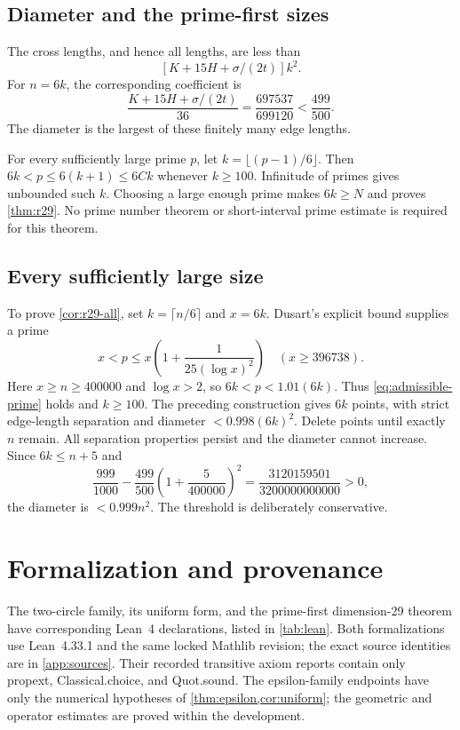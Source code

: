 \documentclass[11pt]{article}
\numberwithin{equation}{section}
\theoremstyle{definition}\newtheorem{definition}[theorem]{Definition}
\theoremstyle{remark}\newtheorem{remark}[theorem]{Remark}
\newcommand{\code}[1]{{\ttfamily\small #1}}
\begin{document}
\subsection{Diameter and the prime-first sizes}

The cross lengths, and hence all lengths, are less than
\[
 [K+15H+\sigma/(2t)]k^2.
\]
For $n=6k$, the corresponding coefficient is
\begin{equation}\label{eq:diameter29}
 \frac{K+15H+\sigma/(2t)}{36}
 =\frac{697537}{699120}<\frac{499}{500}.
\end{equation}
The diameter is the largest of these finitely many edge lengths.

For every sufficiently large prime $p$, let $k=\lfloor(p-1)/6\rfloor$.
Then $6k<p\le6(k+1)\le6Ck$ whenever $k\ge100$. Infinitude of primes gives
unbounded such $k$. Choosing a large enough prime makes $6k\ge N$ and
proves \cref{thm:r29}. No prime number theorem or short-interval prime
estimate is required for this theorem.

\subsection{Every sufficiently large size}

To prove \cref{cor:r29-all}, set $k=\lceil n/6\rceil$ and $x=6k$.
Dusart's explicit bound \cite[Proposition~6.8]{Dusart} supplies a prime
\[
 x<p\le x\left(1+\frac{1}{25(\log x)^2}\right)
 \quad(x\ge396738).
\]
Here $x\ge n\ge400000$ and $\log x>2$, so $6k<p<1.01(6k)$.
Thus \eqref{eq:admissible-prime} holds and $k\ge100$. The preceding
construction gives $6k$ points, with strict edge-length separation and
diameter $<0.998(6k)^2$. Delete points until exactly $n$ remain.
All separation properties persist and the diameter cannot increase.
Since $6k\le n+5$ and
\[
 \frac{999}{1000}
 -\frac{499}{500}\left(1+\frac{5}{400000}\right)^2
 =\frac{3120159501}{3200000000000}>0,
\]
the diameter is $<0.999n^2$. The threshold is deliberately conservative.

\section{Formalization and provenance}\label{sec:formal}

The two-circle family, its uniform form, and the prime-first dimension-29
theorem have corresponding Lean~4 declarations, listed in
\cref{tab:lean}. Both formalizations use Lean~4.33.1 and the same locked
Mathlib revision; the exact source identities are in \cref{app:sources}.
Their recorded transitive axiom reports contain only
\code{propext}, \code{Classical.choice}, and \code{Quot.sound}.
The epsilon-family endpoints have only the numerical hypotheses of
\cref{thm:epsilon,cor:uniform}; the geometric and operator estimates are
proved within the development.
\end{document}
